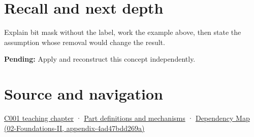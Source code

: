 \section{Recall and next depth}\label{appendix-dbe5905163c2-recall-and-next-depth}

Explain bit mask without the label, work the example above, then state the assumption whose removal would change the result.

\textbf{Pending:} Apply and reconstruct this concept independently.

\section{Source and navigation}\label{appendix-dbe5905163c2-source-and-navigation}

\href{Continuous\%20Notes/Computing\%20Foundations\%20-\%20From\%20Bits\%20to\%20C++\%20and\%20Systems\%20APIs\#From\%20a\%20signal\%20to\%20an\%20interpretation}{C001 teaching chapter} · \hyperref[appendix-fd090d982a15]{Part definitions and mechanisms} · \href{../02-Foundations-II/main.pdf\#nameddest=appendix-4ad47bdd269a}{Dependency Map (02-Foundations-II, appendix-4ad47bdd269a)}
